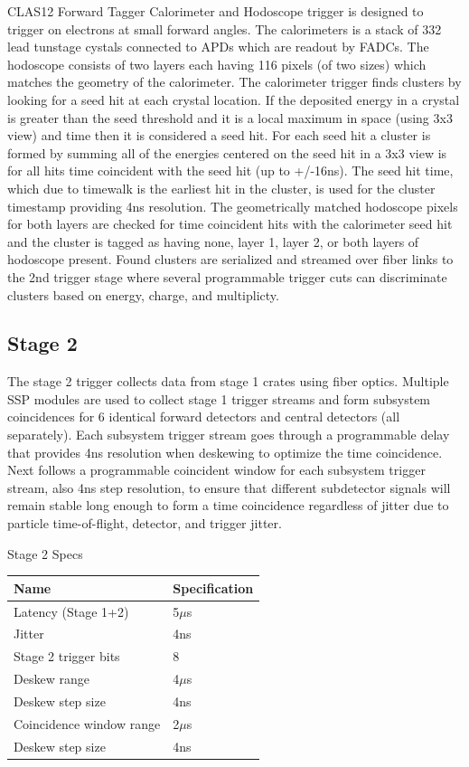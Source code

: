 CLAS12 Forward Tagger Calorimeter and Hodoscope trigger is designed to trigger on electrons at small forward angles. The calorimeters is a stack of 332 lead tunstage cystals connected to APDs which are readout by FADCs. The hodoscope consists of two layers each having 116 pixels (of two sizes) which matches the geometry of the calorimeter. The calorimeter trigger finds clusters by looking for a seed hit at each crystal location. If the deposited energy in a crystal is greater than the seed threshold and it is a local maximum in space (using 3x3 view) and time then it is considered a seed hit. For each seed hit a cluster is formed by summing all of the energies centered on the seed hit in a 3x3 view is for all hits time coincident with the seed hit (up to +/-16ns). The seed hit time, which due to timewalk is the earliest hit in the cluster, is used for the cluster timestamp providing 4ns resolution. The geometrically matched hodoscope pixels for both layers are checked for time coincident hits with the calorimeter seed hit and the cluster is tagged as having none, layer 1, layer 2, or both layers of hodoscope present. Found clusters are serialized and streamed over fiber links to the 2nd trigger stage where several programmable trigger cuts can discriminate clusters based on energy, charge, and multiplicty.

\subsection{Stage 2}

The stage 2 trigger collects data from stage 1 crates using fiber optics. Multiple SSP modules are used to collect stage 1 trigger streams and form subsystem coincidences for 6 identical forward detectors and central detectors (all separately). Each subsystem trigger stream goes through a programmable delay that provides 4ns resolution when deskewing to optimize the time coincidence. Next follows a programmable coincident window for each subsystem trigger stream, also 4ns step resolution, to ensure that different subdetector signals will remain stable long enough to form a time coincidence regardless of jitter due to particle time-of-flight, detector, and trigger jitter.

\begin{center}
	Stage 2 Specs\\
	\begin{tabular}{| l | l |}
		\hline \hline
		Name				& Specification	\\
		\hline
		Latency (Stage 1+2)		& 5$\mu$s	\\
		Jitter				& 4ns		\\
		Stage 2 trigger bits		& 8		\\
		Deskew range			& 4$\mu$s	\\
		Deskew step size		& 4ns	\\
		Coincidence window range	& 2$\mu$s	\\
		Deskew step size		& 4ns	\\
		\hline \hline
	\end{tabular}
\end{center}

